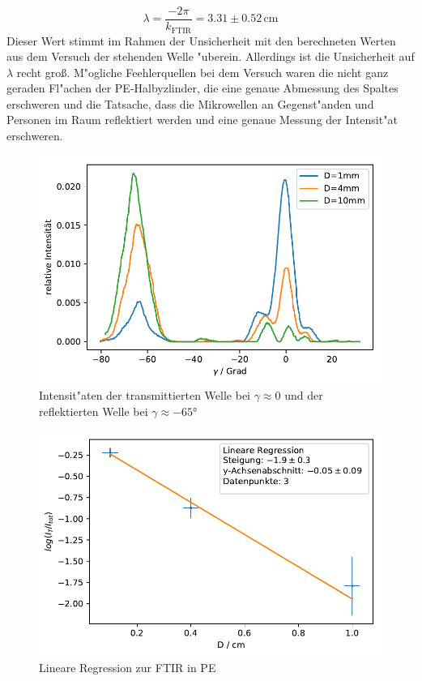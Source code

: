 \documentclass[12pt,a4paper]{article}
\begin{document}
\begin{equation}
\lambda=\frac{-2\pi}{k_{\text{FTIR}}}=3.31\pm0.52\,\text{cm}
\end{equation}
Dieser Wert stimmt im Rahmen der Unsicherheit mit den berechneten Werten aus dem Versuch der stehenden Welle "uberein. Allerdings ist die Unsicherheit auf $\lambda$ recht gro\ss. M"ogliche Feehlerquellen bei dem Versuch waren die nicht ganz geraden Fl"achen der PE-Halbyzlinder, die eine genaue Abmessung des Spaltes erschweren und die Tatsache, dass die Mikrowellen an Gegenst"anden und Personen im Raum reflektiert werden und eine genaue Messung der Intensit"at erschweren.
\begin{figure}
	\centering
	\includegraphics[scale=1]{Bilder/FTIR_Rohdaten.pdf}
	\caption{Intensit"aten der transmittierten Welle bei $\gamma\approx0$ und der reflektierten Welle bei $\gamma\approx\ang{-65}$}
	\label{FTIR_Rohdaten}
\end{figure}
\begin{figure}
	\centering
	\includegraphics[scale=1]{Bilder/FTIR_LinReg.pdf}
	\caption{Lineare Regression zur FTIR in PE}
	\label{FTIR_LinReg}
\end{figure}
\end{document}
